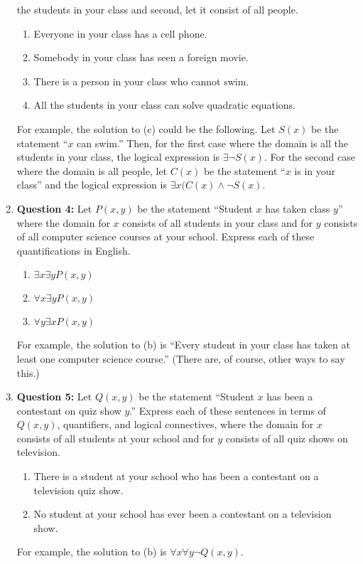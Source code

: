 \documentclass[11pt]{article}
\begin{document}
\begin{enumerate}
the students in your class and second, let it consist of all people.
\begin{enumerate}[label=(\alph*)]
\item Everyone in your class has a cell phone.
\item Somebody in your class has seen a foreign movie.
\item There is a person in your class who cannot swim.
\item All the students in your class can solve quadratic equations.
\end{enumerate}
For example, the solution to (c) could be the following. Let $S(x)$ be the
statement ``$x$ can swim.'' Then, for the first case where the domain is all the
students in your class, the logical expression is $\exists \lnot S(x)$. For the
second case where the domain is all people, let $C(x)$ be the statement ``$x$ is in
your class'' and the logical expression is $\exists x (C(x) \land \lnot S(x)$.
\item
\textbf{Question 4:}
Let $P(x,y)$ be the statement ``Student $x$ has taken class $y$'' where the domain
for $x$ consists of all students in your class and for $y$ consists of all computer
science courses at your school. Express each of these quantifications in English.
\begin{enumerate}[label=(\alph*)]
\item $\exists x \exists y P(x,y)$
\item $\forall x \exists y P(x,y)$
\item $\forall y \exists x P(x,y)$
\end{enumerate}
For example, the solution to (b) is ``Every student in your class has taken at
least one computer science course.'' (There are, of course, other ways to say
this.)
\item
\textbf{Question 5:}
Let $Q(x,y)$ be the statement ``Student $x$ has been a contestant on quiz show
$y$.'' Express each of these sentences in terms of $Q(x,y)$, quantifiers, and
logical connectives, where the domain for $x$ consists of all students at your
school and for $y$ consists of all quiz shows on television.
\begin{enumerate}[label=(\alph*)]
\item There is a student at your school who has been a contestant on a television
quiz show.
\item No student at your school has ever been a contestant on a television show.
\end{enumerate}
For example, the solution to (b) is $\forall x \forall y \lnot Q(x,y)$.

\end{enumerate}
\end{document}
